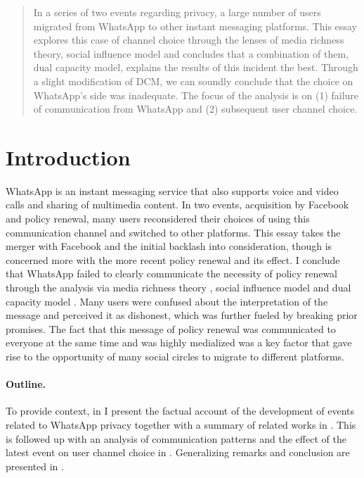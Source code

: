 \begin{abstract}
In a series of two events regarding privacy, a large number of users migrated from WhatsApp to other instant messaging platforms.
This essay explores this case of channel choice through the lenses of media richness theory, social influence model and concludes that a combination of them, dual capacity model, explains the results of this incident the best.
Through a slight modification of DCM, we can soundly conclude that the choice on WhatsApp's side was inadequate.
The focus of the analysis is on (1) failure of communication from WhatsApp and (2) subsequent user channel choice.
\end{abstract}

\section{Introduction}


WhatsApp is an instant messaging service that also supports voice and video calls and sharing of multimedia content.
In two events, acquisition by Facebook and policy renewal, many users reconsidered their choices of using this communication channel and switched to other platforms.
This essay takes the merger with Facebook and the initial backlash into consideration, though is concerned more with the more recent policy renewal and its effect.
I conclude that WhatsApp failed to clearly communicate the necessity of policy renewal through the analysis via media richness theory \citep{daft1983information}, social influence model \citep{fulk1990social} and dual capacity model \citep{sitkin1992dual}.
Many users were confused about the interpretation of the message and perceived it as dishonest, which was further fueled by breaking prior promises.
The fact that this message of policy renewal was communicated to everyone at the same time and was highly medialized was a key factor that gave rise to the opportunity of many social circles to migrate to different platforms.

\paragraph{Outline.}
To provide context, in  I present the factual account of the development of events related to WhatsApp privacy together with a summary of related works in .
This is followed up with an analysis of communication patterns and the effect of the latest event on user channel choice in .
Generalizing remarks and conclusion are presented in .

